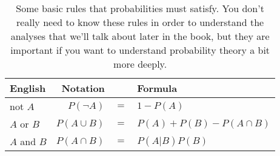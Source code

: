 \begin{table}
\caption{Some basic rules that probabilities must satisfy. You don't really need to know these rules in order to understand the analyses that we'll talk about later in the book, but they are important if you want to understand probability theory a bit more deeply.}\tabcapsep
\label{tab:probrules}
\begin{center}
\begin{tabular}{lrcl}
English & Notation & & Formula \\ \hline
not $A$ & $P(\neg A)$ &$=$& $1-P(A)$ \\
$A$ or $B$ & $P(A \cup B)$ &$=$& $P(A) + P(B) - P(A \cap B)$ \\
$A$ and $B$ & $P(A \cap B)$ &$=$& $P(A|B) P(B)$ \\
\end{tabular}
\tabcapsep \HR
\end{center}
\end{table}




